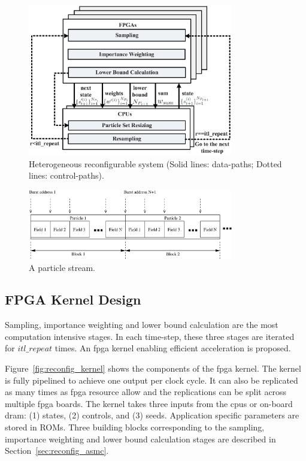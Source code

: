 \begin{figure}[t!]
\centering
\includegraphics[width=0.8\textwidth]{4_adaptation/figures/fig_arch}
\caption[Heterogeneous reconfigurable system]{Heterogeneous reconfigurable system (Solid lines: data-paths; Dotted lines: control-paths).}
\label{fig:reconfig_arch}
\end{figure}

\begin{figure}[t!]
\centering
\includegraphics[width=0.8\textwidth]{4_adaptation/figures/fig_particles}
\caption{A particle stream.}
\label{fig:particles_stream}
\end{figure}

\subsection{FPGA Kernel Design}
Sampling, importance weighting and lower bound calculation are the most computation intensive stages.
In each time-step, these three stages are iterated for $itl\_repeat$ times.
An \gls{fpga} kernel enabling efficient acceleration is proposed.

Figure~\ref{fig:reconfig_kernel} shows the components of the \gls{fpga} kernel.
The kernel is fully pipelined to achieve one output per clock cycle.
It can also be replicated as many times as \gls{fpga} resource allow and the replications can be split across multiple \gls{fpga} boards.
The kernel takes three inputs from the \glspl{cpu} or on-board \gls{dram}: (1) states, (2) controls, and (3) seeds.
Application specific parameters are stored in ROMs.
Three building blocks corresponding to the sampling, importance weighting and lower bound calculation stages are described in Section~\ref{sec:reconfig_asmc}.

